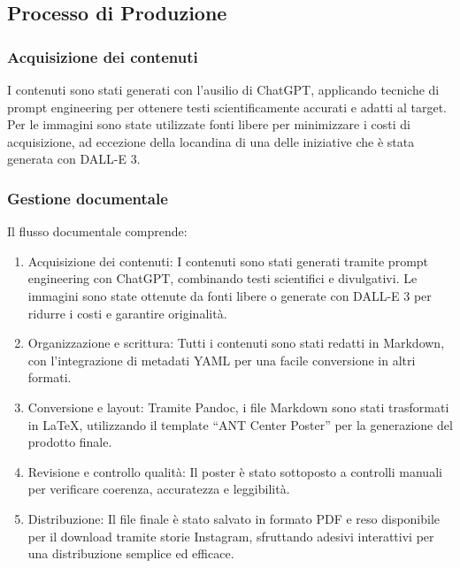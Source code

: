 \documentclass[
]{article}
\providecommand{\tightlist}{%
  \setlength{\itemsep}{0pt}\setlength{\parskip}{0pt}}
\begin{document}
\subsection{Processo di Produzione}\label{processo-di-produzione}

\subsubsection{Acquisizione dei
contenuti}\label{acquisizione-dei-contenuti}

I contenuti sono stati generati con l'ausilio di ChatGPT, applicando
tecniche di prompt engineering per ottenere testi scientificamente
accurati e adatti al target. Per le immagini sono state utilizzate fonti
libere per minimizzare i costi di acquisizione, ad eccezione della
locandina di una delle iniziative che è stata generata con DALL-E 3.

\subsubsection{Gestione documentale}\label{gestione-documentale}

Il flusso documentale comprende:

\begin{enumerate}
\def\labelenumi{\arabic{enumi}.}
\tightlist
\item
  Acquisizione dei contenuti: I contenuti sono stati generati tramite
  prompt engineering con ChatGPT, combinando testi scientifici e
  divulgativi. Le immagini sono state ottenute da fonti libere o
  generate con DALL-E 3 per ridurre i costi e garantire originalità.
\item
  Organizzazione e scrittura: Tutti i contenuti sono stati redatti in
  Markdown, con l'integrazione di metadati YAML per una facile
  conversione in altri formati.
\item
  Conversione e layout: Tramite Pandoc, i file Markdown sono stati
  trasformati in LaTeX, utilizzando il template ``ANT Center Poster''
  per la generazione del prodotto finale.
\item
  Revisione e controllo qualità: Il poster è stato sottoposto a
  controlli manuali per verificare coerenza, accuratezza e leggibilità.
\item
  Distribuzione: Il file finale è stato salvato in formato PDF e reso
  disponibile per il download tramite storie Instagram, sfruttando
  adesivi interattivi per una distribuzione semplice ed efficace.
\end{enumerate}
\end{document}
